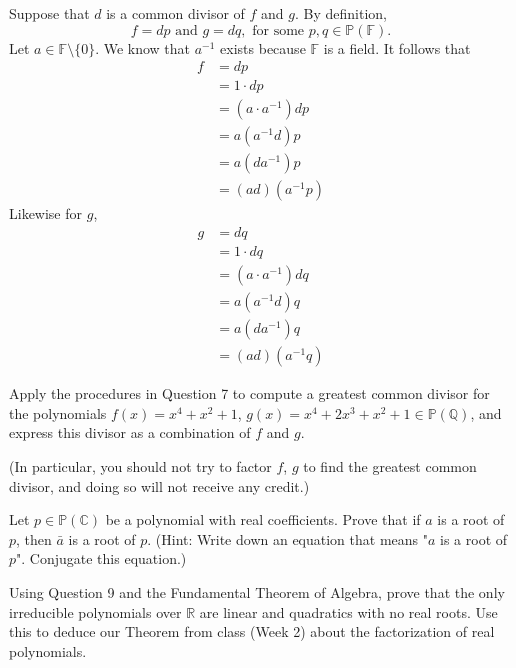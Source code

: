 \documentclass{article}
\theoremstyle{plain} %
\numberwithin{thm}{section} %
\theoremstyle{definition}
\begin{document}
\begin{question}{7}
        Suppose that \(d\) is a common divisor of \(f\) and \(g\). By definition,
        \[
            f = dp \text{ and } g = dq, \text{ for some } p, q \in \mathbb{P} (\mathbb{F}).
        \]
        Let \(a \in \mathbb{F} \setminus \{0\}\). We know that \(a ^{-1}\) exists because \(\mathbb{F}\) is a field. It follows that
        \begin{align*}
            f &= dp \\
            &= 1 \cdot dp \tag{additive identity} \\
            &= (a \cdot a ^{-1})dp \\
            &= a (a^{-1}d) p \tag{associativity} \\
            &= a(d a^{-1}) p \tag{commutativity} \\
            &= (ad)(a^{-1} p) \tag{associativity} 
        \end{align*}
        Likewise for \(g\),
        \begin{align*}
            g &= dq \\
            &= 1 \cdot dq \tag{additive identity} \\
            &= (a \cdot a ^{-1})dq \\
            &= a (a^{-1}d) q \tag{associativity} \\
            &= a(d a^{-1}) q \tag{commutativity} \\
            &= (ad)(a^{-1} q) \tag{associativity}
        \end{align*}
    \end{question}
    \newpage
    \begin{question}{8}
        Apply the procedures in Question 7 to compute a greatest common divisor for the polynomials
        \(f(x) = x^4 + x^2 + 1\), \(g(x) = x^4 + 2x^3 + x^2 + 1 \in \mathbb{P}(\mathbb{Q})\), and express this divisor as a combination
        of \(f\) and \(g\).

        (In particular, you should not try to factor \(f\), \(g\) to find the greatest common divisor, and doing
        so will not receive any credit.)
    \end{question}
    \newpage
    \begin{question}{9}
        Let $p \in \mathbb{P}(\mathbb{C})$ be a polynomial with real coefficients. Prove that if $a$ is a root of $p$, then $\bar{a}$ is a root of $p$. (Hint: Write down an equation that means "$a$ is a root of $p$". Conjugate this equation.)
    \end{question}
    \newpage
    \begin{question}{10}
        Using Question 9 and the Fundamental Theorem of Algebra, prove that the only irreducible 
        polynomials over $\mathbb{R}$ are linear and quadratics with no real roots. Use this to deduce our Theorem from class (Week 2) about the factorization of real polynomials.
    \end{question}
\end{document}
